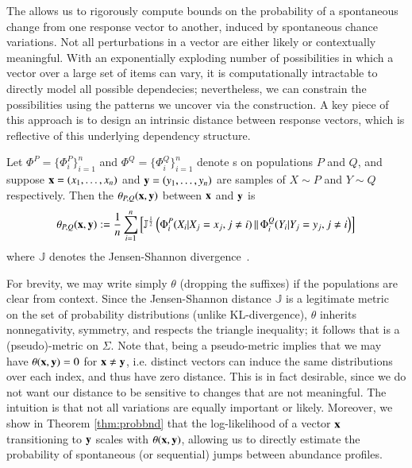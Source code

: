 \documentclass[onecolumn,10pt]{IEEEtran}
\begin{document}
The \qnet allows us to rigorously compute  bounds on  the probability of a spontaneous change from one response vector to another, induced by spontaneous chance variations. Not all perturbations in a vector are either likely or contextually meaningful. With an exponentially exploding number of possibilities in which a vector over a large set of items can vary, it is computationally intractable to directly model all possible dependecies; nevertheless, we can constrain the possibilities using the patterns we uncover via the \qnet construction.  A key piece of this approach is to design  an intrinsic distance between response vectors, which is reflective of this underlying  dependency structure.  

\begin{defn}[\qdist]
  \label{defqdistance} 
  Let $\Phi^P = \{\Phi_i^P\}_{i=1}^n$ and $\Phi^Q = \{\Phi_i^Q\}_{i=1}^n$ denote {\qnet}s on populations $P$ and $Q$, and suppose $\bm{\mathrm{x}}=(x_1, \ldots, x_n)$ and $\bm{\mathrm{y}} =(y_1, \ldots, y_n)$ are samples of $X \sim P$ and $Y \sim Q$ respectively. Then the \qdist $\theta_{P,Q}(\bm{\mathrm{x}},\bm{\mathrm{y}})$ between $\bm{\mathrm{x}}$ and $\bm{\mathrm{y}}$ is\[\theta_{P,Q}(\bm{\mathrm{x}},\bm{\mathrm{y}}) := \frac{1}{n}\sum_{i=1}^n \left[ \mathbb{J}^{\frac{1}{2}} \left(\Phi_i^P(X_i |X_j = x_j, j \neq i) \,\|\, \Phi_i^Q(Y_i|Y_j = y_j, j \neq i\right ) \right]\]%
  where $\mathbb{J}$ denotes the Jensen-Shannon divergence~\cite{cover}.
\end{defn}

For brevity, we may write simply $\theta$ (dropping the suffixes) if the populations are clear from context.  Since the Jensen-Shannon distance $\mathbb{J}$ is a legitimate metric~\cite{fuglede2004jensen} on the set of probability distributions (unlike KL-divergence), $\theta$ inherits nonnegativity, symmetry, and respects the triangle inequality; it follows that \qdist is a (pseudo)-metric on $\Sigma$. Note that, being a pseudo-metric implies that  we may have $\theta(\bm{\mathrm{x}}, \bm{\mathrm{y}}) = 0$ for $\bm{\mathrm{x}} \neq \bm{\mathrm{y}}$, i.e. distinct vectors can induce the same distributions over each index, and thus have zero distance. This is in fact desirable, since we do  not want  our distance to be sensitive to changes that are not meaningful.  The intuition is that not all variations are equally important or likely.    Moreover, we show in Theorem \ref{thm:probbnd} that the log-likelihood of a vector $\bm{\mathrm{x}}$ transitioning to $\bm{\mathrm{y}}$ scales with $\theta(\bm{\mathrm{x}},\bm{\mathrm{y}})$, allowing us to directly estimate the probability of spontaneous (or sequential) jumps between abundance profiles.
\end{document}
